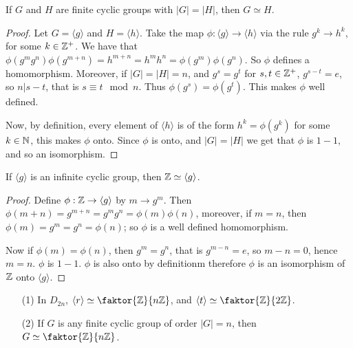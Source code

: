 \begin{theorem}\label{lemma_2.3.5}
  If $G$ and  $H$ are finite cyclic groups with  $|G|=|H|$, then $G
  \simeq H$.
\end{theorem}
\begin{proof}
  Let $G=\langle g \rangle$ and $H=\langle h \rangle$. Take the map
  $\phi:\langle g \rangle \rightarrow \langle h \rangle$ via the rule
  $g^k \rightarrow h^k$, for some $k \in \mathbb{Z}^+$. We have that
  $\phi(g^mg^n)\phi(g^{m+n})=h^{m+n}=h^mh^n=\phi(g^m)\phi(g^n)$. So $\phi$
  defines a homomorphism. Moreover, if $|G|=|H|=n$, and $g^s=g^t$ for
  $s,t \in \mathbb{Z}^+$,  $g^{s-t}=e$, so $n|s-t$, that is  $s \equiv t \mod{n}$.
  Thus $\phi(g^s)=\phi(g^t)$. This makes $\phi$ well defined.

  Now, by definition, every element of  $\langle h \rangle$ is of the form
  $h^k=\phi(g^k)$ for some $k \in \mathbb{N}$, this makes  $\phi$ onto. Since  $\phi$
  is onto, and  $|G|=|H|$ we get that $\phi$ is  $1-1$, and so an
  isomorphism.
\end{proof}
\begin{corollary}
  If $\langle g \rangle$ is an infinite cyclic group, then $\mathbb{Z} \simeq
  \langle g \rangle$.
\end{corollary}
\begin{proof}
  Define $\phi:\mathbb{Z} \rightarrow \langle g \rangle$ by $m \rightarrow g^m$. Then
  $\phi(m+n)=g^{m+n}=g^mg^n=\phi(m)\phi(n)$, moreover, if $m=n$, then
  $\phi(m)=g^m=g^n=\phi(n)$; so $\phi$ is a well defined homomorphism.

  Now if  $\phi(m)=\phi(n)$, then $g^m=g^n$, that is  $g^{m-n}=e$, so $m-n=0$,
  hence  $m=n$.  $\phi$ is  $1-1$.  $\phi$ is also onto by definitionm
  therefore  $\phi$ is an isomorphism of  $\mathbb{Z}$ onto $\langle g \rangle$.
\end{proof}

\begin{example}
  \begin{enumerate}
    \item[(1)] In $D_{2n}$, $\langle r \rangle \simeq
      \faktor{\Z}{n\Z}$, and $\langle t \rangle \simeq
      \faktor{\Z}{2\Z}$.

    \item[(2)] If $G$ is any finite cyclic group of order $|G|=n$,
      then $G \simeq \faktor{\Z}{n\Z}$.
  \end{enumerate}
\end{example}

